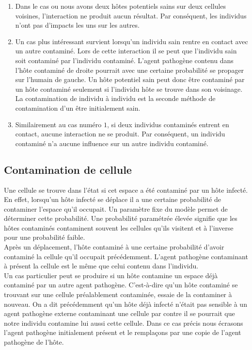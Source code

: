 \begin{enumerate}
    \item Dans le cas ou nous avons deux hôtes potentiels sains sur deux cellules voisines, l'interaction ne produit aucun résultat. Par conséquent, les individus n'ont pas d’impacts les uns sur les autres.
    \item Un cas plus intéressant survient lorsqu'un individu sain rentre en contact avec un autre contaminé. Lors de cette interaction il se peut que l'individu sain soit contaminé par l'individu contaminé. L'agent pathogène contenu dans l'hôte contaminé de droite pourrait avec une certaine probabilité se propager sur l'humain de gauche. Un hôte potentiel sain peut donc être contaminé par un hôte contaminé seulement si l'individu hôte se trouve dans son voisinage. La contamination de individu à individu est la seconde méthode de contamination d'un être initialement sain.
    \item Similairement au cas numéro $1$, si deux individus contaminés entrent en contact, aucune interaction ne se produit. Par conséquent, un individu contaminé n'a aucune influence sur un autre individu contaminé.
\end{enumerate}

\subsection{Contamination de cellule}

Une cellule se trouve dans l'état si cet espace a été contaminé par un hôte infecté. En effet, lorsqu’un hôte infecté se déplace il a une certaine probabilité de contaminer l'espace qu'il occupait. Un paramètre fixe du modèle permet de déterminer cette probabilité. Une probabilité paramétrée élevée signifie que les hôtes contaminés contaminent souvent les cellules qu'ils visitent et à l'inverse pour une probabilité faible.\\

Après un déplacement, l'hôte contaminé à une certaine probabilité d'avoir contaminé la cellule qu'il occupait précédemment. L'agent pathogène contaminant à présent la cellule est le même que celui contenu dans l'individu.\\

Un cas particulier peut se produire si un hôte contamine un espace déjà contaminé par un autre agent pathogène. C'est-à-dire qu'un hôte contaminé se trouvant sur une cellule préalablement contaminée, essaie de la contaminer à nouveau. On a dit précédemment qu'un hôte déjà infecté n'était pas sensible à un agent pathogène externe contaminant une cellule par contre il se pourrait que notre individu contamine lui aussi cette cellule. Dans ce cas précis nous écrasons l'agent pathogène initialement présent et le remplaçons par une copie de l'agent pathogène de l'hôte.

